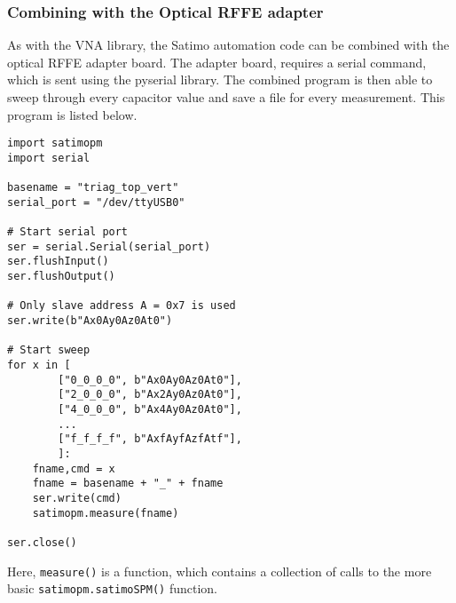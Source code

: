 \subsubsection{Combining with the Optical RFFE adapter}
As with the VNA library, the Satimo automation code can be combined with the optical RFFE adapter board. The adapter board, requires a serial command, which is sent using the pyserial library. The combined program is then able to sweep through every capacitor value and save a file for every measurement. This program is listed below. 
\begin{lstlisting}
import satimopm
import serial

basename = "triag_top_vert"
serial_port = "/dev/ttyUSB0"

# Start serial port
ser = serial.Serial(serial_port)
ser.flushInput()
ser.flushOutput()

# Only slave address A = 0x7 is used
ser.write(b"Ax0Ay0Az0At0")

# Start sweep
for x in [
        ["0_0_0_0", b"Ax0Ay0Az0At0"],
        ["2_0_0_0", b"Ax2Ay0Az0At0"],
        ["4_0_0_0", b"Ax4Ay0Az0At0"],
        ...
        ["f_f_f_f", b"AxfAyfAzfAtf"],
        ]:
    fname,cmd = x
    fname = basename + "_" + fname
    ser.write(cmd)
    satimopm.measure(fname)

ser.close()
\end{lstlisting}

Here, \verb|measure()| is a function, which contains a collection of calls to the more basic \verb|satimopm.satimoSPM()| function.
